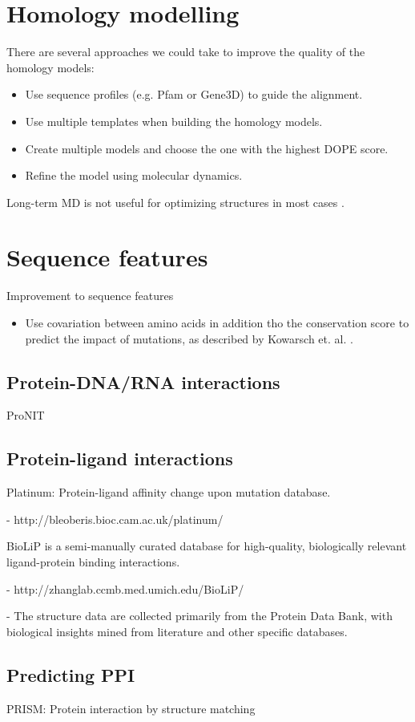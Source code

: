 \section{Homology modelling}

There are several approaches we could take to improve the quality of the homology models:

\begin{itemize}
\item Use sequence profiles (e.g. Pfam or Gene3D) to guide the alignment.
\item Use multiple templates when building the homology models.
\item Create multiple models and choose the one with the highest DOPE score.
\item Refine the model using molecular dynamics.
\end{itemize}

Long-term MD is not useful for optimizing structures in most cases \cite{raval_refinement_2012}.



\section{Sequence features}

Improvement to sequence features

\begin{itemize}
\item Use covariation between amino acids in addition tho the conservation score to predict the impact of mutations, as described by Kowarsch et. al. \cite{kowarsch_correlated_2010}.
\end{itemize}



\subsection{Protein-DNA/RNA interactions}

ProNIT



\subsection{Protein-ligand interactions}

Platinum: Protein-ligand affinity change upon mutation database.

  - http://bleoberis.bioc.cam.ac.uk/platinum/


BioLiP is a semi-manually curated database for high-quality, biologically relevant ligand-protein binding interactions.

  - http://zhanglab.ccmb.med.umich.edu/BioLiP/

  - The structure data are collected primarily from the Protein Data Bank, with biological insights mined from literature and other specific databases.

\subsection{Predicting PPI}

PRISM: Protein interaction by structure matching
